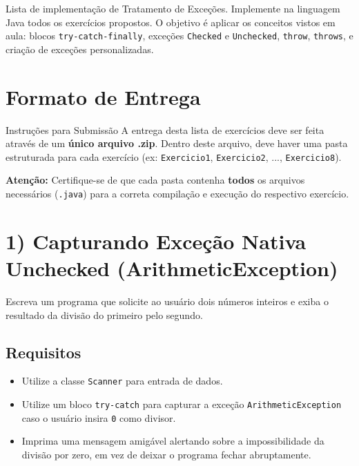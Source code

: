\documentclass[12pt]{article}
\begin{document}
Lista de implementação de Tratamento de Exceções. Implemente na linguagem Java todos os exercícios propostos. O objetivo é aplicar os conceitos vistos em aula: blocos \texttt{try-catch-finally}, exceções \texttt{Checked} e \texttt{Unchecked}, \texttt{throw}, \texttt{throws}, e criação de exceções personalizadas.

\section*{Formato de Entrega}

\begin{block}{Instruções para Submissão}
A entrega desta lista de exercícios deve ser feita através de um \textbf{único arquivo .zip}.
Dentro deste arquivo, deve haver uma pasta estruturada para cada exercício (ex: \texttt{Exercicio1}, \texttt{Exercicio2}, ..., \texttt{Exercicio8}).

\textbf{Atenção:} Certifique-se de que cada pasta contenha \textbf{todos} os arquivos necessários (\texttt{.java}) para a correta compilação e execução do respectivo exercício.
\end{block}

\section*{1) Capturando Exceção Nativa Unchecked (ArithmeticException)}
Escreva um programa que solicite ao usuário dois números inteiros e exiba o resultado da divisão do primeiro pelo segundo.

\subsection*{Requisitos}
\begin{itemize}
    \item Utilize a classe \texttt{Scanner} para entrada de dados.
    \item Utilize um bloco \texttt{try-catch} para capturar a exceção \texttt{ArithmeticException} caso o usuário insira \texttt{0} como divisor.
    \item Imprima uma mensagem amigável alertando sobre a impossibilidade da divisão por zero, em vez de deixar o programa fechar abruptamente.
\end{itemize}

\end{document}
